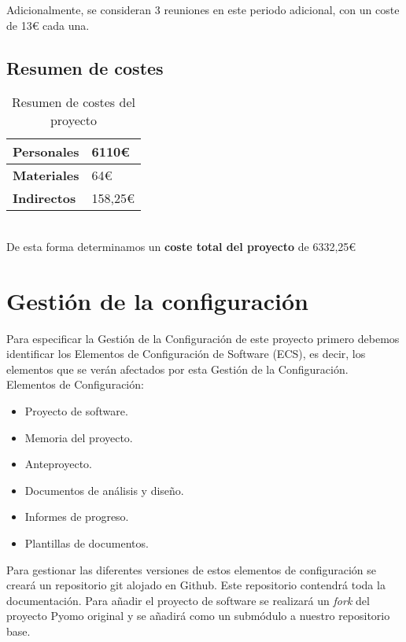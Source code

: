 Adicionalmente, se consideran 3 reuniones en este periodo adicional, con un coste de 13{\euro} cada una.

\subsection{Resumen de costes}

\begin{table} [h]
    \begin{tabularx}{\linewidth}{|p{3cm}|X|}
        \hline
        \textbf{Personales} & 6110{\euro} \tabularnewline
        \hline
        \textbf{Materiales} & 64{\euro} \tabularnewline
        \hline
        \textbf{Indirectos} & 158,25{\euro} \tabularnewline
        \hline
    \end{tabularx}
    \caption{Resumen de costes del proyecto}
    \label{tab:costes-resumen}
\end{table}
    \ \\
De esta forma determinamos un \textbf{coste total del proyecto} de 6332,25{\euro}

\section{Gestión de la configuración}

Para especificar la Gestión de la Configuración de este proyecto primero debemos identificar los Elementos de Configuración de Software (ECS), es decir, los elementos que se verán afectados por esta Gestión de la Configuración.\\

Elementos de Configuración:
\begin{itemize}
    \item Proyecto de software.
    \item Memoria del proyecto.
    \item Anteproyecto.
    \item Documentos de análisis y diseño.
    \item Informes de progreso.
    \item Plantillas de documentos.
\end{itemize}

Para gestionar las diferentes versiones de estos elementos de configuración se creará un repositorio git alojado en Github. Este repositorio contendrá toda la documentación. Para añadir el proyecto de software se realizará un \textit{fork} del proyecto Pyomo original y se añadirá como un submódulo a nuestro repositorio base. \\

